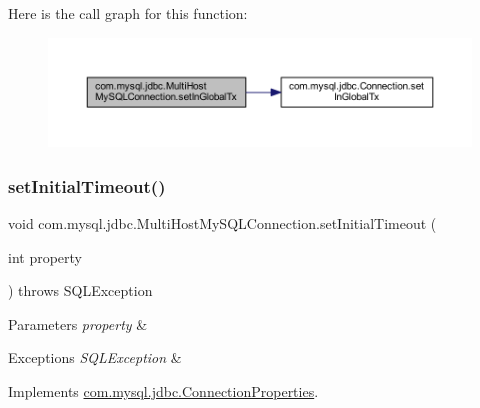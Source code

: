 Here is the call graph for this function\+:
\nopagebreak
\begin{figure}[H]
\begin{center}
\leavevmode
\includegraphics[width=350pt]{classcom_1_1mysql_1_1jdbc_1_1_multi_host_my_s_q_l_connection_ae2310c7ba07ef821c22538d1a4cc4c84_cgraph}
\end{center}
\end{figure}
\mbox{\label{classcom_1_1mysql_1_1jdbc_1_1_multi_host_my_s_q_l_connection_aeab355b0e9150013c3690b5be17ea12e}} 
\subsubsection{\texorpdfstring{set\+Initial\+Timeout()}{setInitialTimeout()}}
{\footnotesize\ttfamily void com.\+mysql.\+jdbc.\+Multi\+Host\+My\+S\+Q\+L\+Connection.\+set\+Initial\+Timeout (\begin{DoxyParamCaption}\item[{int}]{property }\end{DoxyParamCaption}) throws S\+Q\+L\+Exception}


\begin{DoxyParams}{Parameters}
{\em property} & \\
\hline
\end{DoxyParams}

\begin{DoxyExceptions}{Exceptions}
{\em S\+Q\+L\+Exception} & \\
\hline
\end{DoxyExceptions}


Implements \mbox{\hyperlink{interfacecom_1_1mysql_1_1jdbc_1_1_connection_properties_aaf6a88938cc10d9607cbcba5f3ac75a2}{com.\+mysql.\+jdbc.\+Connection\+Properties}}.

